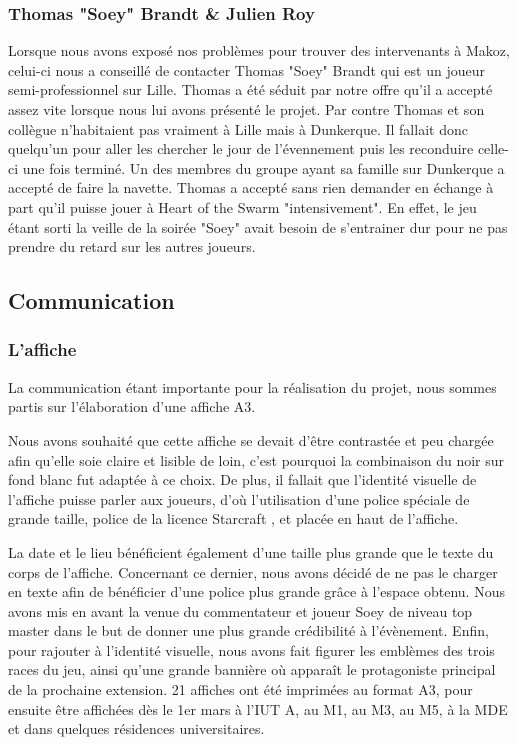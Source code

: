 \subsubsection{Thomas "Soey" Brandt \& Julien Roy}%
\label{ssub:tthomas_soey_brandt_&_julien_roy}

Lorsque nous avons exposé nos problèmes pour trouver des intervenants à
Makoz, celui-ci nous a conseillé de contacter Thomas "Soey" Brandt qui
est un joueur semi-professionnel sur Lille. Thomas a été séduit par
notre offre qu'il a accepté assez vite lorsque nous lui avons présenté
le projet. Par contre Thomas et son collègue n'habitaient pas vraiment à
Lille mais à Dunkerque. Il fallait donc quelqu'un pour aller les
chercher le jour de l'évennement puis les reconduire celle-ci une fois
terminé. Un des membres du groupe ayant sa famille sur Dunkerque a
accepté de faire la navette. Thomas a accepté sans rien demander en
échange à part qu'il puisse jouer à Heart of the Swarm "intensivement".
En effet, le jeu étant sorti la veille de la soirée "Soey" avait besoin
de s'entrainer dur pour ne pas prendre du retard sur les autres joueurs.

\subsection{Communication}%
\label{sub:communication}

\subsubsection{L'affiche}%
\label{ssub:l_affiche}

La communication étant importante pour la réalisation du projet, nous sommes partis sur l'élaboration
d'une affiche A3.

Nous avons souhaité que cette affiche se devait d’être contrastée et peu chargée afin qu’elle soie
claire et lisible de loin, c’est pourquoi la combinaison du noir sur fond blanc fut adaptée à ce choix.
De plus, il fallait que l’identité visuelle de l’affiche puisse parler aux joueurs, d’où l’utilisation
d’une police spéciale de grande taille, police de la licence \og Starcraft \fg{}, et placée en haut de l’affiche.

La date et le lieu bénéficient également d’une taille plus grande que le texte du corps de l’affiche.
Concernant ce dernier, nous avons décidé de ne pas le charger en texte afin de bénéficier d’une police
plus grande grâce à l’espace obtenu.
Nous avons mis en avant la venue du commentateur et joueur Soey  de niveau \og top master \fg{}  dans le but
de donner une plus grande crédibilité à l’évènement.
Enfin, pour rajouter à l’identité visuelle, nous avons fait figurer  les emblèmes des trois races du jeu,
ainsi qu’une grande bannière où apparaît le protagoniste principal de la prochaine extension.
21 affiches ont été imprimées au format A3, pour ensuite être affichées dès le 1er mars à l’IUT A, au M1,
au M3, au M5, à la MDE et dans quelques résidences universitaires.

